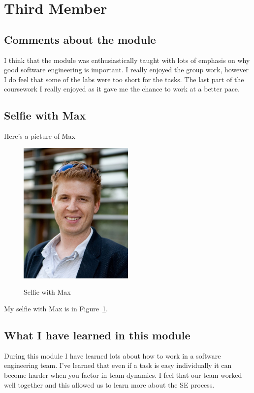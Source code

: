 

\section{Third Member}


\subsection{Comments about the module}
I think that the module was enthusiastically taught with lots of emphasis on why good software engineering is important. I really enjoyed the group work, however I do feel that some of the labs were too short for the tasks. The last part of the coursework I really enjoyed as it gave me the chance to work at a better pace. 

\subsection{Selfie with Max}

Here's a picture of Max

\begin{figure}[h]
\caption{Selfie with Max}
\centering
\includegraphics[width=0.5\textwidth]{max.png}
\label{fig:selfie}
\end{figure}


My selfie with Max is in  Figure~\ref{fig:selfie}.

\subsection{What I have learned in this module}
During this module I have learned lots about how to work in a software engineering team. I've learned that even if a task is easy individually it can become harder when you factor in team dynamics. I feel that our team worked well together and this allowed us to learn more about the SE process. 

